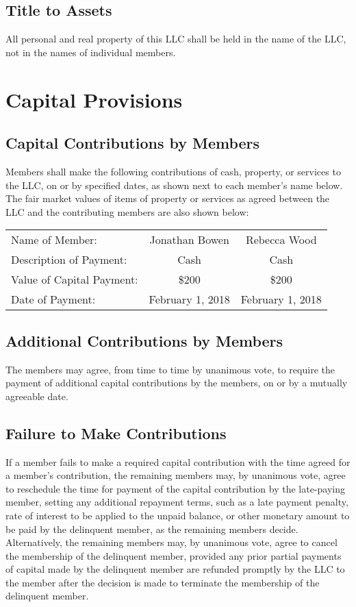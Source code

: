\documentclass{article}
\begin{document}
		\subsection{Title to Assets}
		 All personal and real property of this LLC shall be held in the name of the LLC, not in the names of individual members.
	

	\section{Capital Provisions}

			\subsection{Capital Contributions by Members}
			Members shall make the following contributions of cash, property, or services to the LLC, on or by specified dates, as shown next to each member's name below. The fair market values of items of property or services as agreed between the LLC and the contributing members are also shown below:
				\begin{center}
					\begin{tabular}{l c c}
						Name of Member: & Jonathan Bowen & Rebecca Wood\\
						Description of Payment: & Cash & Cash\\
						Value of Capital Payment: & \$200 & \$200\\
						Date of Payment: & February 1, 2018 & February 1, 2018\\
					\end{tabular}
				\end{center}
			\subsection{Additional Contributions by Members}
			The members may agree, from time to time by unanimous vote, to require the payment of additional capital contributions by the members, on or by a mutually agreeable date.

			\subsection{Failure to Make Contributions}
			If a member fails to make a required capital contribution with the time agreed for a member's contribution, the remaining members may, by unanimous vote, agree to reschedule the time for payment of the capital contribution by the late-paying member, setting any additional repayment terms, such as a late payment penalty, rate of interest to be applied to the unpaid balance, or other monetary amount to be paid by the delinquent member, as the remaining members decide. Alternatively, the remaining members may, by unanimous vote, agree to cancel the membership of the delinquent member, provided any prior partial payments of capital made by the delinquent member are refunded promptly by the LLC to the member after the decision is made to terminate the membership of the delinquent member.
\end{document}
